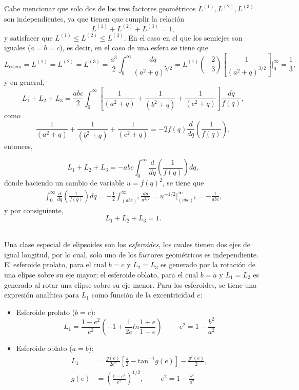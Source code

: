 \documentclass[paper=letter, fontsize=12pt,]{article}
\begin{document}
Cabe mencionar que solo dos de los tres factores geométricos $L^{(1)},L^{(2)},L^{(3)}$ son independientes, ya que tienen que cumplir la relación 
\begin{equation}
    L^{(1)}+L^{(2)}+L^{(3)}=1,
\end{equation}
y satisfacer que $L^{(1)}\leq L^{(2)}\leq L^{(3)}$. En el caso en el que los semiejes son iguales ($a=b=c$), es decir, en el caso de una esfera se tiene que
\begin{equation}
    L_{\mbox{esfera}}=L^{(1)}=L^{(2)}=L^{(3)}=\frac{a^3}{2}\int_0^{\infty}\frac{dq}{(a^2+q)^{5/2}}=L^{(1)}\left(-\frac{2}{3}\right)\left[\frac{1}{(a^2+q)^{3/2}}\right]\Bigg |_0^{\infty}=\frac{1}{3},
\end{equation}
y en general, 
\begin{equation}
    L_1+L_2+L_3=\frac{abc}{2}\int_0^{\infty}\left[\frac{1}{(a^2+q)}+\frac{1}{(b^2+q)}+\frac{1}{(c^2+q)}\right]\frac{dq}{f(q)},
\end{equation}
como
$$\frac{1}{(a^2+q)}+\frac{1}{(b^2+q)}+\frac{1}{(c^2+q)}=-2 f(q)\frac{d}{dq}\left(\frac{1}{f(q)}\right),$$
entonces,

$$L_1+L_2+L_3=-abc\int_0^{\infty}\frac{d}{dq}\left(\frac{1}{f(q)}\right)dq,$$
donde haciendo un cambio de variable $u=f(q)^2$, se tiene que
\begin{align*}
    \int_0^{\infty}\frac{d}{dq}\left(\frac{1}{f(q)}\right)dq=-\frac{1}{2}\int_{(abc)^2}^{\infty}\frac{du}{u^{3/2}}=u^{-1/2}\Big|_{(abc)^2}^{\infty}=-\frac{1}{abc},
\end{align*}
y por consiguiente, 
\begin{equation}
    L_1+L_2+L_3=1.
\end{equation}

\\

Una clase especial de elipsoides son los \textit{esferoides}, los cuales tienen dos ejes de igual longitud, por lo cual, solo uno de los factores geométricos es independiente. El esferoide prolato, para el cual $b=c$ y $L_2=L_3$ es generado por la rotación de una elipse sobre su eje mayor; el esferoide oblato, para el cual $b=a$ y $L_1=L_2$ es generado al rotar una elipse sobre su eje menor. Para los esferoides, se tiene una expresión analítica para $L_1$ como función de la excentricidad $e$:
\begin{itemize}
    \item Esferoide prolato ($b=c$):
    \begin{equation}
        L_1=\frac{1-e^2}{e^2}\left(-1+\frac{1}{2e}ln\frac{1+e}{1-e}\right)\hspace{1cm}e^2=1-\frac{b^2}{a^2}
    \end{equation}
    \item Esferoide oblato ($a=b$):
    \begin{align}
        L_1&=\frac{g(e)}{2e^2}\left[\frac{\pi}{2}-\mbox{tan}^{-1}g(e)\right]-\frac{g^2(e)}{2},\\
        g(e)&=\left(\frac{1-e^2}{e^2}\right)^{1/2},\hspace{1cm}e^2=1-\frac{c^2}{a^2}
    \end{align}
\end{itemize}
\end{document}
